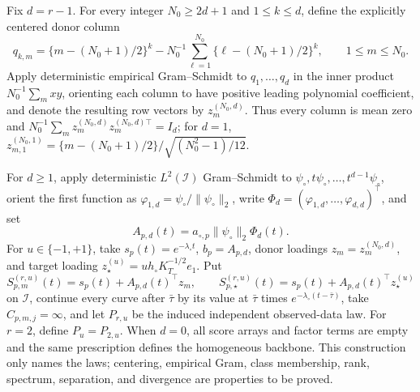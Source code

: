 Fix \(d=r-1\).  For every integer \(N_0\ge2d+1\) and \(1\le k\le d\), define the explicitly centered donor column
\[
 q_{k,m}=\{m-(N_0+1)/2\}^k-
 N_0^{-1}\sum_{\ell=1}^{N_0}\{\ell-(N_0+1)/2\}^k,
 \qquad 1\le m\le N_0.
\]
Apply deterministic empirical Gram--Schmidt to \(q_1,\ldots,q_d\) in the inner product \(N_0^{-1}\sum_m xy\), orienting each column to have positive leading polynomial coefficient, and denote the resulting row vectors by \(z_m^{(N_0,d)}\).  Thus every column is mean zero and \(N_0^{-1}\sum_m z_m^{(N_0,d)}z_m^{(N_0,d)\top}=I_d\); for \(d=1\), \(z_{m,1}^{(N_0,1)}=\{m-(N_0+1)/2\}/\sqrt{(N_0^2-1)/12}\).

For \(d\ge1\), apply deterministic \(L^2(\mathcal I)\) Gram--Schmidt to \(\psi_\circ,t\psi_\circ,\ldots,t^{d-1}\psi_\circ\), orient the first function as \(\varphi_{1,d}=\psi_\circ/\|\psi_\circ\|_2\), write \(\Phi_d=(\varphi_{1,d},\ldots,\varphi_{d,d})^\top\), and set
\[
 A_{p,d}(t)=a_{\circ,p}\|\psi_\circ\|_2\Phi_d(t).
\]
For \(u\in\{-1,+1\}\), take \(s_p(t)=e^{-\lambda_\circ t}\), \(b_p=A_{p,d}\), donor loadings \(z_m=z_m^{(N_0,d)}\), and target loading \(z_\star^{(u)}=u h_\circ K_T^{-1/2}e_1\).  Put
\[
 S_{p,m}^{(r,u)}(t)=s_p(t)+A_{p,d}(t)^\top z_m,
 \qquad
 S_{p,\star}^{(r,u)}(t)=s_p(t)+A_{p,d}(t)^\top z_\star^{(u)}
\]
on \(\mathcal I\), continue every curve after \(\bar\tau\) by its value at \(\bar\tau\) times \(e^{-\lambda_\circ(t-\bar\tau)}\), take \(C_{p,m,j}=\infty\), and let \(P_{r,u}\) be the induced independent observed-data law.  For \(r=2\), define \(P_u=P_{2,u}\).  When \(d=0\), all score arrays and factor terms are empty and the same prescription defines the homogeneous backbone.  This construction only names the laws; centering, empirical Gram, class membership, rank, spectrum, separation, and divergence are properties to be proved.